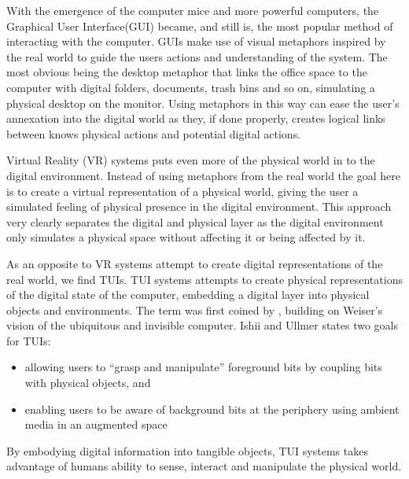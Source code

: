 With the emergence of the computer mice and more powerful computers, the Graphical User Interface(GUI) became, and still is, the most popular method of interacting with the computer.
GUIs make use of visual metaphors inspired by the real world to guide the users actions and understanding of the system.
The most obvious being the desktop metaphor that links the office space to the computer with digital folders, documents, trash bins and so on, simulating a physical desktop on the monitor.
Using metaphors in this way can ease the user's annexation into the digital world as they, if done properly, creates logical links between knows physical actions and potential digital actions.

Virtual Reality (VR) systems puts even more of the physical world in to the digital environment.
Instead of using metaphors from the real world the goal here is to create a virtual representation of a physical world, giving the user a simulated feeling of physical presence in the digital environment.
This approach very clearly separates the digital and physical layer as the digital environment only simulates a physical space without affecting it or being affected by it.

As an opposite to VR systems attempt to create digital representations of the real world, we find TUIs.
TUI systems attempts to create physical representations of the digital state of the computer, embedding a digital layer into physical objects and environments.
The term was first coined by \cite{ishii1997tangible}, building on Weiser's vision of the ubiquitous and invisible computer.
Ishii and Ullmer states two goals for TUIs:
\begin{itemize}
		\item{allowing users to ``grasp and manipulate'' foreground bits by coupling bits with physical objects, and}
		\item{enabling users to be aware of background bits at the periphery using ambient media in an augmented space}
\end{itemize}
By embodying digital information into tangible objects, TUI systems takes advantage of humans ability to sense, interact and manipulate the physical world. 


